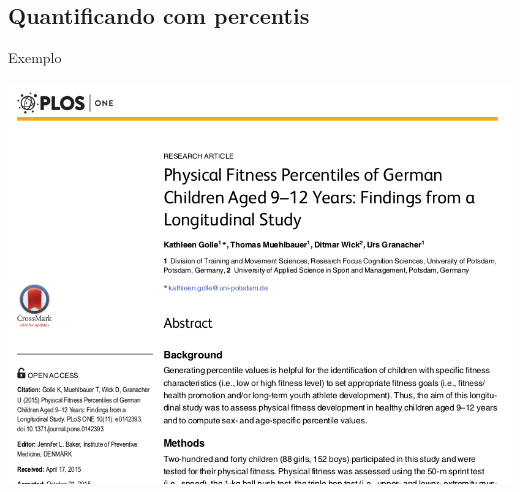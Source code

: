 \documentclass{beamer}
\begin{document}

\subsection{Quantificando com percentis}

\begin{frame}{\scriptsize Exemplo}
  \begin{center}
    \includegraphics[height=\textheight]{Cap3/percentil0}
  \end{center}
\end{frame}
\end{document}
